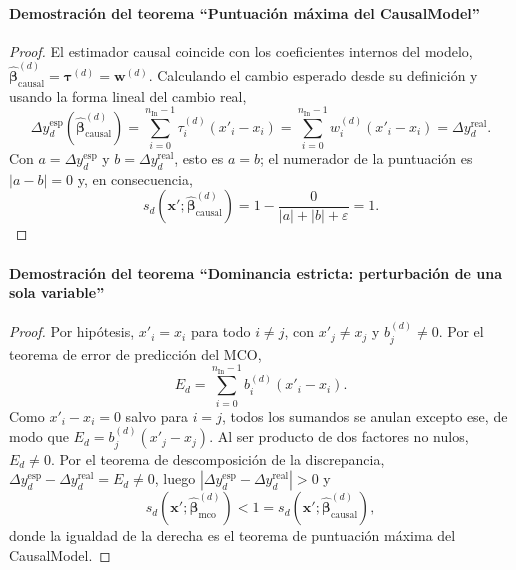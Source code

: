 \documentclass[12pt]{report} %
\begin{document}
\paragraph*{Demostración del teorema ``Puntuación máxima del CausalModel''}
\begin{proof}
    El estimador causal coincide con los coeficientes internos del modelo, $\widehat{\boldsymbol{\beta}}^{(d)}_{\text{causal}} = \boldsymbol{\tau}^{(d)} = \mathbf{w}^{(d)}$. Calculando el cambio esperado desde su definición y usando la forma lineal del cambio real,
    $$\Delta y_d^{\text{esp}}\!\left(\widehat{\boldsymbol{\beta}}^{(d)}_{\text{causal}}\right) = \sum_{i=0}^{n_{\text{In}}-1} \tau_i^{(d)} (x'_i - x_i) = \sum_{i=0}^{n_{\text{In}}-1} w_i^{(d)} (x'_i - x_i) = \Delta y_d^{\text{real}}.$$
    Con $a = \Delta y_d^{\text{esp}}$ y $b = \Delta y_d^{\text{real}}$, esto es $a = b$; el numerador de la puntuación es $|a - b| = 0$ y, en consecuencia,
    $$s_d\!\left(\mathbf{x}'; \widehat{\boldsymbol{\beta}}^{(d)}_{\text{causal}}\right) = 1 - \frac{0}{|a| + |b| + \varepsilon} = 1.$$
\end{proof}

\paragraph*{Demostración del teorema ``Dominancia estricta: perturbación de una sola variable''}
\begin{proof}
    Por hipótesis, $x'_i = x_i$ para todo $i \neq j$, con $x'_j \neq x_j$ y $b_j^{(d)} \neq 0$. Por el teorema de error de predicción del MCO,
    $$E_d = \sum_{i=0}^{n_{\text{In}}-1} b_i^{(d)} (x'_i - x_i).$$
    Como $x'_i - x_i = 0$ salvo para $i = j$, todos los sumandos se anulan excepto ese, de modo que $E_d = b_j^{(d)} (x'_j - x_j)$. Al ser producto de dos factores no nulos, $E_d \neq 0$. Por el teorema de descomposición de la discrepancia, $\Delta y_d^{\text{esp}} - \Delta y_d^{\text{real}} = E_d \neq 0$, luego $|\Delta y_d^{\text{esp}} - \Delta y_d^{\text{real}}| > 0$ y
    $$s_d\!\left(\mathbf{x}'; \widehat{\boldsymbol{\beta}}^{(d)}_{\text{mco}}\right) < 1 = s_d\!\left(\mathbf{x}'; \widehat{\boldsymbol{\beta}}^{(d)}_{\text{causal}}\right),$$
    donde la igualdad de la derecha es el teorema de puntuación máxima del CausalModel.
\end{proof}
\end{document}

